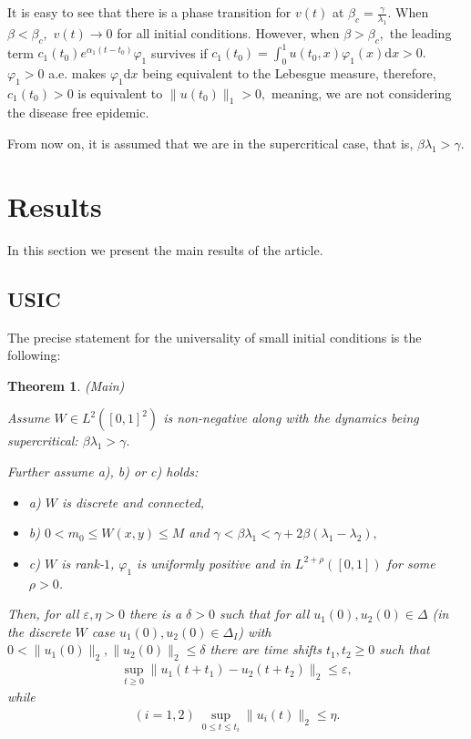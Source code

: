 \documentclass{article}
\renewcommand{\d}{\mathrm{d}}
\newcommand{\1}[1]{{\mathds{1}}_{\left\{#1\right\}}}
\newtheorem{theorem}{Theorem}
\begin{document}
It is easy to see that there is a phase transition for $v(t)$ at $\beta_c= \frac{\gamma}{\lambda_1}.$ When $\beta<\beta_c,$ $v(t) \to 0$ for all initial conditions. However, when $\beta>\beta_c,$ the leading term $c_1(t_0)e^{\alpha_1(t-t_0)}\varphi_1$ survives if $c_1(t_0)=\int_{0}^{1} u(t_0,x)\varphi_1(x) \d x>0.$ $\varphi_1>0$ a.e. makes $\varphi_1 \d x$ being equivalent to the Lebesgue measure, therefore, $c_1(t_0)>0$ is equivalent to $\| u(t_0)\|_1>0,$ meaning, we are not considering the disease free epidemic.

From now on, it is assumed that we are in the supercritical case, that is, $\beta \lambda_1>\gamma.$

\section{Results}
\label{s:results}
In this section we present the main results of the article.

\subsection{USIC}

The precise statement for the universality of small initial conditions is the following:
\label{ss:usic}

\begin{theorem} (Main)
\label{t:main}

Assume $W \in L^2([0,1]^2)$ is non-negative along with the dynamics being supercritical: $\beta \lambda_1>\gamma.$

Further assume a), b) or c) holds:
\begin{itemize}
	\item{a)} $W$ is discrete and connected,
	\item{b)} $0<m_0 \leq W(x,y) \leq M$ and $\gamma<\beta \lambda_1<\gamma+2\beta(\lambda_1-\lambda_2), $
	\item{c)} $W$ is rank-$1$, $\varphi_1$ is uniformly positive and in $L^{2+\rho}([0,1])$ for some $\rho>0$.
\end{itemize}

Then, for all $\varepsilon, \eta>0$ there is a $\delta>0$ such that for all $u_1(0),u_2(0) \in \Delta$ (in the discrete $W$ case $u_1(0),u_2(0) \in \Delta_I$) with $0<\| u_1(0)\|_2, \|u_2(0)\|_2 \leq \delta$ there are time shifts $t_1,t_2 \geq 0$ such that
\begin{align}
\label{eq:USIC_main_part}
\sup_{t \geq 0} \|u_1(t+t_1)-u_2(t+t_2) \|_2 \leq \varepsilon,
\end{align}
while
\begin{align}
\label{eq:USIC_second_part}
(i=1,2) \ \sup_{0 \leq t \leq t_i} \| u_i(t)\|_2 \leq \eta.
\end{align}
\end{theorem}
\end{document}
